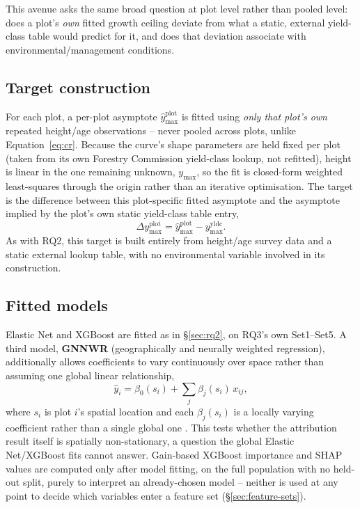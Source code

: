 \documentclass[11pt,a4paper]{report}
\begin{document}
This avenue asks the same broad question at plot level rather than pooled level: does a plot's
\emph{own} fitted growth ceiling deviate from what a static, external yield-class table would
predict for it, and does that deviation associate with environmental/management conditions.

\subsection{Target construction}

For each plot, a per-plot asymptote $\hat y_{\max}^{\text{plot}}$ is fitted using \emph{only that
plot's own} repeated height/age observations -- never pooled across plots, unlike
Equation~\ref{eq:cr}. Because the curve's shape parameters are held fixed per plot (taken from
its own Forestry Commission yield-class lookup, not refitted), height is linear in the one
remaining unknown, $y_{\max}$, so the fit is closed-form weighted least-squares through the
origin rather than an iterative optimisation. The target is the difference between this
plot-specific fitted asymptote and the asymptote implied by the plot's own static yield-class
table entry,
\begin{equation}
\Delta y_{\max}^{\text{plot}} = \hat y_{\max}^{\text{plot}} - y_{\max}^{\text{yldc}}.
\label{eq:local-ymax-diff}
\end{equation}
As with RQ2, this target is built entirely from height/age survey data and a static external
lookup table, with no environmental variable involved in its construction.

\subsection{Fitted models}

Elastic Net and XGBoost are fitted as in \S\ref{sec:rq2}, on RQ3's own Set1--Set5. A third model,
\textbf{GNNWR} (geographically and neurally weighted regression), additionally allows coefficients
to vary continuously over space rather than assuming one global linear relationship,
\begin{equation}
\hat y_i = \beta_0(s_i) + \sum_j \beta_j(s_i)\,x_{ij},
\label{eq:gnnwr}
\end{equation}
where $s_i$ is plot $i$'s spatial location and each $\beta_j(s_i)$ is a locally varying
coefficient rather than a single global one \citep{du2020}. %
This tests whether the attribution result itself is spatially non-stationary, a question the
global Elastic Net/XGBoost fits cannot answer. Gain-based XGBoost importance and SHAP values are
computed only after model fitting, on the full population with no held-out split, purely to
interpret an already-chosen model -- neither is used at any point to decide which variables enter
a feature set (\S\ref{sec:feature-sets}).
\end{document}
